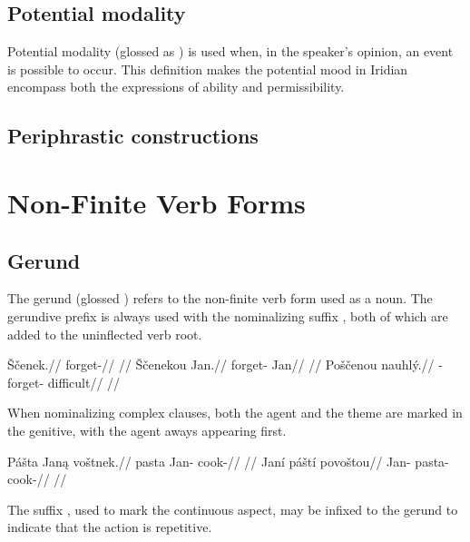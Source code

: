 \subsection{Potential modality}

Potential modality (glossed as ) is used when, in the speaker's opinion, an event is possible to occur. This definition makes the potential mood in Iridian encompass both the expressions of ability and permissibility.



\subsection{Periphrastic constructions}


\section{Non-Finite Verb Forms}

\subsection{Gerund}
\par The gerund (glossed ) refers to the non-finite verb form used as a noun. The gerundive prefix  is always used with the nominalizing suffix , both of which are added to the uninflected verb root.

\pex
\a
\begingl
\gla \v{S}\v{c}enek.//
\glb forget-//
\glft {}//
\endgl
\a
\begingl
\gla \v{S}\v{c}enekou Jan.//
\glb forget- Jan//
\glft {}//
\endgl
\a
\begingl
\gla Po\v{s}\v{c}enou nauhl\'y.//
\glb {}-forget- difficult//
\glft {}//
\endgl
\xe

When nominalizing complex clauses, both the agent and the theme are marked in the genitive, with the agent aways appearing first.

\pex
\a
\begingl
\gla P\'a\v{s}ta Jan\k{a} vo\v{s}tnek.//
\glb pasta Jan- cook-//
\glft {}//
\endgl
\a
\begingl
\gla Jan\'i p\'a\v{s}t\'i povo\v{s}tou//
\glb Jan- pasta- cook-//
\glft {}//
\endgl
\xe

The suffix , used to mark the continuous aspect, may be infixed to the gerund to indicate that the action is repetitive.

